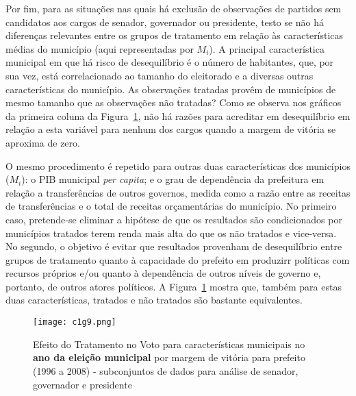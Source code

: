 Por fim, para as situações nas quais há exclusão de observações de partidos sem candidatos aos cargos de senador, governador ou presidente, testo se não há diferenças relevantes entre os grupos de tratamento em relação às características médias do município (aqui representadas por $M_{i}$). A principal característica municipal em que há risco de desequilíbrio é o número de habitantes, que, por sua vez, está correlacionado ao tamanho do eleitorado e a diversas outras características do município. As observações tratadas provêm de municípios de mesmo tamanho que as observações não tratadas? Como se observa nos gráficos da primeira coluna da Figura~\ref{fig:c1g9}, não há razões para acreditar em desequilíbrio em relação a esta variável para nenhum dos cargos quando a margem de vitória se aproxima de zero.

O mesmo procedimento é repetido para outras duas características dos municípios ($M_{i}$): o PIB municipal \textit{per capita}; e o grau de dependência da prefeitura em relação a transferências de outros governos, medida como a razão entre as receitas de transferências e o total de receitas orçamentárias do município. No primeiro caso, pretende-se eliminar a hipótese de que os resultados são condicionados por municípios tratados terem renda mais alta do que os não tratados e vice-versa. No segundo, o objetivo é evitar que resultados provenham de desequilíbrio entre grupos de tratamento quanto à capacidade do prefeito em produzirr políticas com recursos próprios e/ou quanto à dependência de outros níveis de governo e, portanto, de outros atores políticos. A Figura~\ref{fig:c1g9} mostra que, também para estas duas características, tratados e não tratados são bastante equivalentes.

\begin{figure}[htp]
	\centering
	\texttt{[image: c1g9.png]}
	\caption{Efeito do Tratamento no Voto para características municipais no \textbf{ano da eleição municipal} por margem de vitória para prefeito (1996 a 2008) - subconjuntos de dados para análise de senador, governador e presidente}
	\label{fig:c1g9} 
\end{figure}

